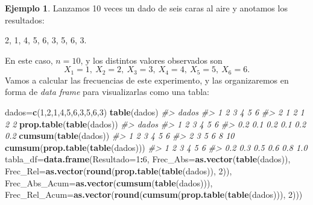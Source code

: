 \documentclass[
]{book}
\newenvironment{Shaded}{\begin{snugshade}}{\end{snugshade}}
\newcommand{\CommentTok}[1]{\textcolor[rgb]{0.56,0.35,0.01}{\textit{#1}}}
\newcommand{\DataTypeTok}[1]{\textcolor[rgb]{0.13,0.29,0.53}{#1}}
\newcommand{\DecValTok}[1]{\textcolor[rgb]{0.00,0.00,0.81}{#1}}
\newcommand{\KeywordTok}[1]{\textcolor[rgb]{0.13,0.29,0.53}{\textbf{#1}}}
\newcommand{\NormalTok}[1]{#1}
\newcommand{\OperatorTok}[1]{\textcolor[rgb]{0.81,0.36,0.00}{\textbf{#1}}}
\theoremstyle{definition}
\theoremstyle{definition}
\newtheorem{example}{Ejemplo}[chapter]
\theoremstyle{definition}
\theoremstyle{remark}
\begin{document}
\begin{example}
\protect\hypertarget{exm:dados}{}{\label{exm:dados} }Lanzamos 10 veces un dado de seis caras al aire y anotamos los resultados:
\end{example}

2, 1, 4, 5, 6, 3, 5, 6, 3.

En este caso, \(n=10\), y los distintos valores observados son
\[
X_1=1,\ X_2=2,\ X_3=3,\ X_4=4,\ X_5=5,\ X_6=6.
\]
Vamos a calcular las frecuencias de este experimento, y las organizaremos en forma de \emph{data frame} para visualizarlas como una tabla:

\begin{Shaded}
\begin{Highlighting}[]
\NormalTok{dados=}\KeywordTok{c}\NormalTok{(}\DecValTok{1}\NormalTok{,}\DecValTok{2}\NormalTok{,}\DecValTok{1}\NormalTok{,}\DecValTok{4}\NormalTok{,}\DecValTok{5}\NormalTok{,}\DecValTok{6}\NormalTok{,}\DecValTok{3}\NormalTok{,}\DecValTok{5}\NormalTok{,}\DecValTok{6}\NormalTok{,}\DecValTok{3}\NormalTok{)}
\KeywordTok{table}\NormalTok{(dados)}
\CommentTok{\#\textgreater{} dados}
\CommentTok{\#\textgreater{} 1 2 3 4 5 6 }
\CommentTok{\#\textgreater{} 2 1 2 1 2 2}
\KeywordTok{prop.table}\NormalTok{(}\KeywordTok{table}\NormalTok{(dados))}
\CommentTok{\#\textgreater{} dados}
\CommentTok{\#\textgreater{}   1   2   3   4   5   6 }
\CommentTok{\#\textgreater{} 0.2 0.1 0.2 0.1 0.2 0.2}
\KeywordTok{cumsum}\NormalTok{(}\KeywordTok{table}\NormalTok{(dados))}
\CommentTok{\#\textgreater{}  1  2  3  4  5  6 }
\CommentTok{\#\textgreater{}  2  3  5  6  8 10}
\KeywordTok{cumsum}\NormalTok{(}\KeywordTok{prop.table}\NormalTok{(}\KeywordTok{table}\NormalTok{(dados)))}
\CommentTok{\#\textgreater{}   1   2   3   4   5   6 }
\CommentTok{\#\textgreater{} 0.2 0.3 0.5 0.6 0.8 1.0}
\NormalTok{tabla\_df=}\KeywordTok{data.frame}\NormalTok{(}\DataTypeTok{Resultado=}\DecValTok{1}\OperatorTok{:}\DecValTok{6}\NormalTok{, }
  \DataTypeTok{Frec\_Abs=}\KeywordTok{as.vector}\NormalTok{(}\KeywordTok{table}\NormalTok{(dados)), }
  \DataTypeTok{Frec\_Rel=}\KeywordTok{as.vector}\NormalTok{(}\KeywordTok{round}\NormalTok{(}\KeywordTok{prop.table}\NormalTok{(}\KeywordTok{table}\NormalTok{(dados)), }\DecValTok{2}\NormalTok{)), }
  \DataTypeTok{Frec\_Abs\_Acum=}\KeywordTok{as.vector}\NormalTok{(}\KeywordTok{cumsum}\NormalTok{(}\KeywordTok{table}\NormalTok{(dados))), }
  \DataTypeTok{Frec\_Rel\_Acum=}\KeywordTok{as.vector}\NormalTok{(}\KeywordTok{round}\NormalTok{(}\KeywordTok{cumsum}\NormalTok{(}\KeywordTok{prop.table}\NormalTok{(}\KeywordTok{table}\NormalTok{(dados))), }\DecValTok{2}\NormalTok{)))}

\end{Highlighting}
\end{Shaded}
\end{document}
